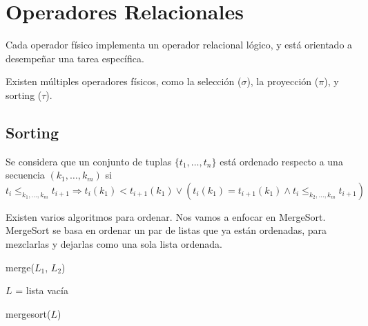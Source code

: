 \section{Operadores Relacionales}
Cada operador físico implementa un operador relacional lógico, y está orientado a desempeñar una tarea específica.

Existen múltiples operadores físicos, como la selección ($\sigma$), la proyección ($\pi$), y sorting ($\tau$).

\subsection{Sorting}
Se considera que un conjunto de tuplas $\{ t_1, \ldots, t_n \}$ está ordenado respecto a una secuencia $(k_1, \ldots, k_m)$ si
\[ t_i \leq_{k_1, \ldots, k_m} t_{i+1} \Rightarrow t_i(k_1) < t_{i+1}(k_1) \vee (t_i(k_1) = t_{i+1}(k_1) \wedge t_i \leq_{k_2, \ldots, k_m} t_{i+1}) \]

Existen varios algoritmos para ordenar. Nos vamos a enfocar en MergeSort. MergeSort se basa en ordenar un par de listas que ya están ordenadas, para mezclarlas y dejarlas como una sola lista ordenada.

\begin{paracol}{2}
  \begin{algorithm}[h]
    \caption{merge($L_1$, $L_2$)}
    $L$ = lista vacía\;
    
  \end{algorithm}
  
  \switchcolumn
  
  \begin{algorithm}[h]
    \caption{mergesort($L$)}
    
  \end{algorithm}
\end{paracol}
\pagebreak

